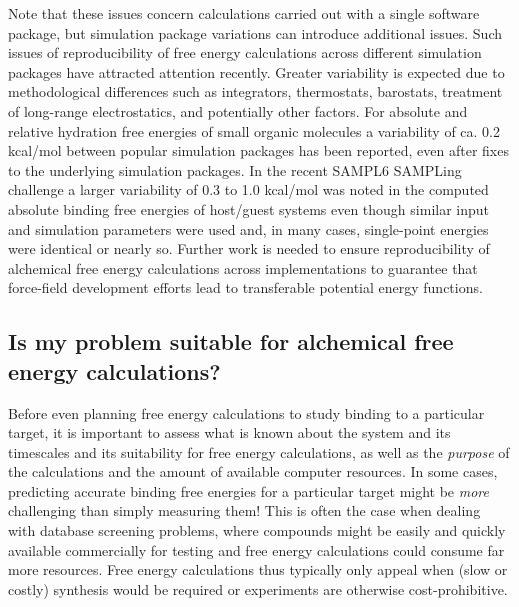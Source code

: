\documentclass[9pt,bestpractices]{livecoms}
\begin{document}
Note that these issues concern calculations carried out with a single software package, but simulation package variations can introduce additional issues. Such issues of reproducibility of free energy calculations across different simulation packages have attracted attention recently. Greater variability is expected due to methodological differences such as integrators, thermostats, barostats, treatment of long-range electrostatics, and potentially other factors. For absolute and relative hydration free energies of small organic molecules a variability of ca. 0.2 kcal/mol between popular simulation packages has been reported, even after fixes to the underlying simulation packages.\cite{loeffler2018reproducibility} In the recent SAMPL6 SAMPLing challenge a larger variability of 0.3 to 1.0 kcal/mol was noted in the computed absolute binding free energies of host/guest systems even though similar input and simulation parameters were used \cite{rizzi2019sampl6} and, in many cases, single-point energies were identical or nearly so. Further work is needed to ensure reproducibility of alchemical free energy calculations across implementations to guarantee that force-field development efforts lead to transferable potential energy functions. 
%
\subsection{Is my problem suitable for alchemical free energy calculations?}
\label{subsec:suitability}
Before even planning free energy calculations to study binding to a
particular target, it is important to assess what is known about the
system and its timescales and its suitability for free energy
calculations, as well as the \emph{purpose} of the calculations and
the amount of available computer resources. In some cases, predicting accurate binding free energies for a particular target might be
\emph{more} challenging than simply measuring them! This is
often the case when dealing with database screening problems, where
compounds might be easily and quickly available commercially for
testing and free energy calculations could consume far more resources. Free energy calculations thus typically only
appeal when (slow or costly) synthesis would be required or experiments are otherwise cost-prohibitive.
\end{document}
